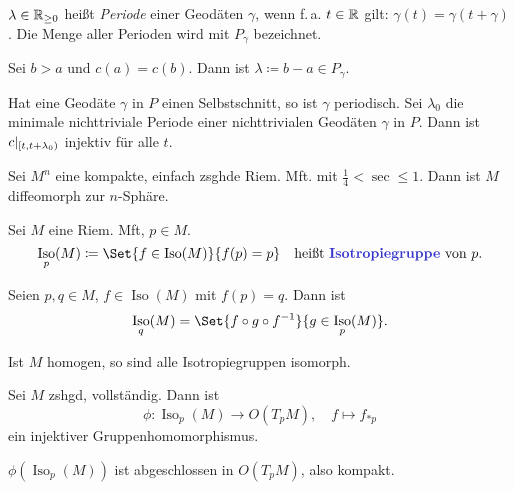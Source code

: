 \documentclass{cheat-sheet}
\DeclareMathOperator{\Iso}{Iso} %
\begin{document}
\begin{defn}
  $\lambda \in \mathbb{R}_{\geq 0}$ heißt \emph{Periode} einer Geodäten $\gamma$, wenn f.\,a. $t \in \mathbb{R}$ gilt: $\gamma(t) = \gamma(t + \gamma)$. Die Menge aller Perioden wird mit $P_\gamma$ bezeichnet.
\end{defn}


\begin{lem}
  Sei $b > a$ und $c(a) = c(b)$. Dann ist $\lambda \coloneqq b - a \in P_\gamma$.
\end{lem}

\begin{kor}
  Hat eine Geodäte $\gamma$ in $P$ einen Selbstschnitt, so ist $\gamma$ periodisch. Sei $\lambda_0$ die minimale nichttriviale Periode einer nichttrivialen Geodäten $\gamma$ in $P$. Dann ist $c|_{\left[ t, t+\lambda_0 \right)}$ injektiv für alle $t$.
\end{kor}


\begin{satz}
  Sei $M^n$ eine kompakte, einfach zsghde Riem. Mft. mit $\tfrac{1}{4} < \sec \leq 1$. Dann ist $M$ diffeomorph zur $n$-Sphäre.
\end{satz}

\begin{defn}
  Sei $M$ eine Riem. Mft, $p \in M$.
  \[
    \Iso_p(M) \coloneqq \Set{ f \in \Iso(M) }{ f(p) = p } \quad
    \text{heißt \emph{Isotropiegruppe} von $p$.}
  \]
\end{defn}

\begin{lem}
  Seien $p, q \in M$, $f \in \Iso(M)$ mit $f(p) = q$. Dann ist
  \[ \Iso_q(M) = \Set{ f \circ g \circ f^{-1} }{ g \in \Iso_p(M) }. \]
\end{lem}

\begin{kor}
  Ist $M$ homogen, so sind alle Isotropiegruppen isomorph.
\end{kor}

\begin{bem}
  Sei $M$ zshgd, vollständig. Dann ist
  \[
    \phi : \Iso_p(M) \to O(T_p M), \quad
    f \mapsto f_{*p}
  \]
  ein injektiver Gruppenhomomorphismus.
\end{bem}

\begin{satz}
  $\phi(\Iso_p(M))$ ist abgeschlossen in $O(T_p M)$, also kompakt.
\end{satz}
\end{document}
